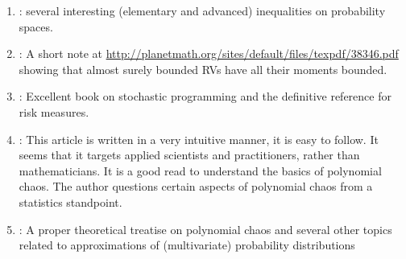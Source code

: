 \documentclass[a4paper,10pt]{article}
\let\oldbibentry\bibentry
\renewcommand{\bibentry}[1]{{\color{blue} \oldbibentry{#1}}}
\begin{document}
{\begin{enumerate}
       and ergodic theorems and some notes on dynamic programming. 
       Available online at \url{https://www.math.nyu.edu/faculty/varadhan/}.
 \item \label{cite:LinBai2011} : several interesting (elementary 
       and advanced) inequalities on probability spaces.  
 \item \label{cite:Ambrosio2013} : A short note at
       \url{http://planetmath.org/sites/default/files/texpdf/38346.pdf}
       showing that almost surely bounded RVs have all their moments bounded.
 \item \label{cite:SDR2014} : Excellent book on stochastic programming and 
       the definitive reference for risk measures.
 \item \label{cite:AOHaganPolyChaos13} : This article is written 
       in a very intuitive manner, it is easy to follow. It seems that it targets applied scientists
       and practitioners, rather than mathematicians. It is a good read to understand the basics of 
       polynomial chaos. The author questions certain aspects of polynomial chaos from 
       a statistics standpoint.
 \item \label{cite:DXiu10} : A proper theoretical treatise on polynomial chaos
       and several other topics related to approximations of (multivariate) probability distributions
\end{enumerate}
}



\end{document}
